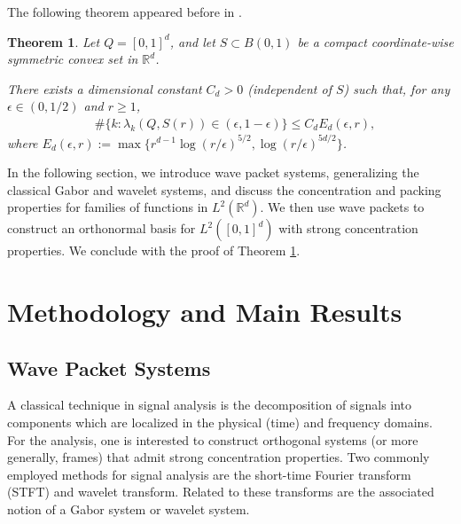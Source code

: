 \documentclass[conference]{IEEEtran}
\def\R{\mathbb{R}}
\newtheorem{theorem}{Theorem}[section]
\numberwithin{equation}{section}
\def\R{\mathbb{R}}
\begin{document}
The following theorem appeared before in \cite{israelmayeli2023acha}. 

\begin{theorem}\label{mainthm:cube_convex}
Let $Q = [0,1]^d$, and  let $S \subset B(0,1)$ be a compact coordinate-wise symmetric convex set in $\R^d$. 

There exists a dimensional constant $C_d > 0$ (independent of $S$) such that, for any $\epsilon \in (0,1/2)$ and $r \geq 1$, 
\begin{align}\label{eig_clust:eqn1}
& \# \{ k : \lambda_k(Q,S(r)) \in (\epsilon, 1-\epsilon)\} \leq C_d E_d(\epsilon,r),
\end{align}
where $E_d(\epsilon,r) := \max \{ r^{d-1} \log(r/\epsilon)^{5/2}, \log(r/\epsilon)^{5d/2} \}$.
\end{theorem}

In the following section, we introduce wave packet systems, generalizing the classical Gabor and wavelet systems, and discuss the concentration and packing properties for families of functions in  $L^2(\R^d)$. We then use wave packets to construct an orthonormal basis for $L^2([0,1]^d)$  with strong concentration properties. We conclude with the proof of Theorem \ref{mainthm:cube_convex}.
 

\section{Methodology and Main Results}
\subsection{Wave Packet Systems}








A classical technique in signal analysis is the decomposition of signals into components which are localized in the physical (time) and frequency domains. For the analysis, one is interested to construct orthogonal systems (or more generally, frames) that admit strong concentration properties. Two commonly employed methods for signal analysis are the short-time Fourier transform (STFT) and wavelet transform. Related to these transforms are the associated notion of a Gabor system or wavelet system.
\end{document}
